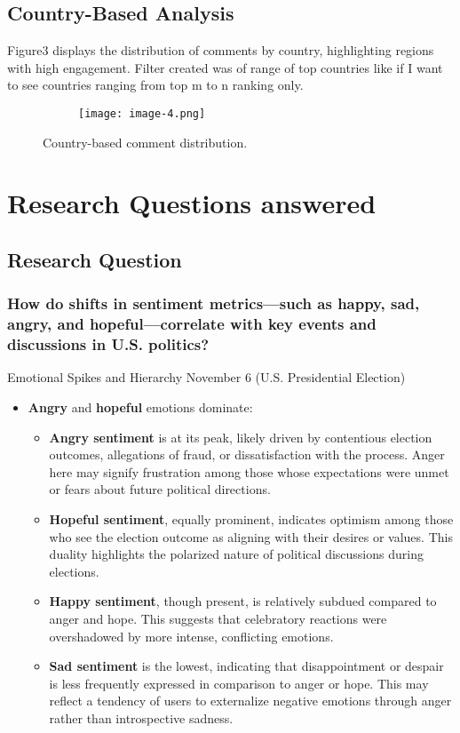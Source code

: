 \documentclass[sigconf]{acmart}
\begin{document}
\subsection{Country-Based Analysis}
Figure3 displays the distribution of comments by country, highlighting regions with high engagement. Filter created was of range of top countries like if I want to see countries ranging from top m to n ranking only.

\begin{figure}[H]
    \centering
    \begin{figure}
        \centering
        \texttt{[image: image-4.png]}
        \label{fig:enter-label}
    \end{figure}
    \caption{Country-based comment distribution.}
    \label{fig:country_map}
\end{figure}



\section{Research Questions answered}

\subsection{Research Question}
\subsubsection{How do shifts in sentiment metrics---such as happy, sad, angry, and hopeful---correlate with key events and discussions in U.S. politics?}

{Emotional Spikes and Hierarchy November 6 (U.S. Presidential Election)}
\begin{itemize}
    \item \textbf{Angry} and \textbf{hopeful} emotions dominate:
    \begin{itemize}
        \item \textbf{Angry sentiment} is at its peak, likely driven by contentious election outcomes, allegations of fraud, or dissatisfaction with the process. Anger here may signify frustration among those whose expectations were unmet or fears about future political directions.
        \item \textbf{Hopeful sentiment}, equally prominent, indicates optimism among those who see the election outcome as aligning with their desires or values. This duality highlights the polarized nature of political discussions during elections.
        \item \textbf{Happy sentiment}, though present, is relatively subdued compared to anger and hope. This suggests that celebratory reactions were overshadowed by more intense, conflicting emotions.
        \item \textbf{Sad sentiment} is the lowest, indicating that disappointment or despair is less frequently expressed in comparison to anger or hope. This may reflect a tendency of users to externalize negative emotions through anger rather than introspective sadness.
    \end{itemize}
\end{itemize}
\end{document}
